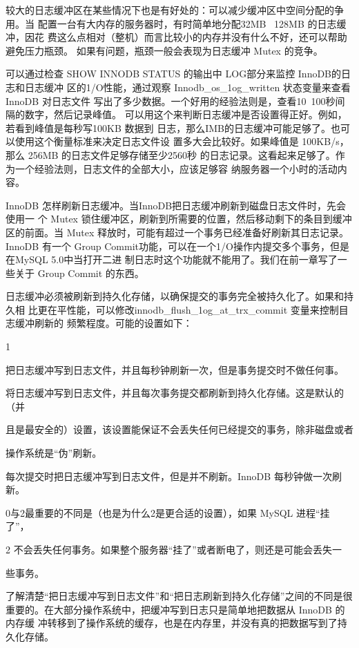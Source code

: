 较大的日志缓冲区在某些情况下也是有好处的：可以减少缓冲区中空间分配的争用。当
配置一台有大内存的服务器时，有时简单地分配32MB~ 128MB 的日志缓冲，因花
费这么点相对（整机）而言比较小的内存并没有什么不好，还可以帮助避免压力瓶颈。
如果有问题，瓶颈一般会表现为日志缓冲 Mutex 的竞争。

可以通过检查 SHOW INNODB STATUS 的输出中 LOG部分来监控 InnoDB的日志和日志缓冲
区的1/O性能，通过观察 Innodb\_os\_1og\_written 状态变量来查看InnoDB 对日志文件
写出了多少数据。一个好用的经验法则是，查看10~100秒间隔的数字，然后记录峰值。
可以用这个来判断日志缓冲是否设置得正好。例如，若看到峰值是每秒写100KB 数据到
日志，那么IMB的日志缓冲可能足够了。也可以使用这个衡量标准来决定日志文件设
置多大会比较好。如果峰值是 100KB/s，那么 256MB 的日志文件足够存储至少2560秒
的日志记录。这看起来足够了。作为一个经验法则，日志文件的全部大小，应该足够容
纳服务器一个小时的活动内容。

InnoDB 怎样刷新日志缓冲。当InnoDB把日志缓冲刷新到磁盘日志文件时，先会使用一
个 Mutex 锁住缓冲区，刷新到所需要的位置，然后移动剩下的条目到缓冲区的前面。当
Mutex 释放时，可能有超过一个事务已经准备好刷新其日志记录。InnoDB 有一个 Group
Commit功能，可以在一个1/O操作内提交多个事务，但是在MySQL 5.0中当打开二进
制日志时这个功能就不能用了。我们在前一章写了一些关于 Group Commit 的东西。

日志缓冲必须被刷新到持久化存储，以确保提交的事务完全被持久化了。如果和持久相
比更在平性能，可以修改innodb\_flush\_1og\_at\_trx\_commit 变量来控制目志缓冲刷新的
频繁程度。可能的设置如下：

1

把日志缓冲写到日志文件，并且每秒钟刷新一次，但是事务提交时不做任何事。

将日志缓冲写到日志文件，并且每次事务提交都刷新到持久化存储。这是默认的（并

且是最安全的）设置，该设置能保证不会丢失任何已经提交的事务，除非磁盘或者

操作系统是“伪”刷新。

每次提交时把日志缓冲写到日志文件，但是并不刷新。InnoDB 每秒钟做一次刷新。

0与2最重要的不同是（也是为什么2是更合适的设置），如果 MySQL 进程“挂了”，

2 不会丢失任何事务。如果整个服务器“挂了”或者断电了，则还是可能会丢失一

些事务。

了解清楚“把日志缓冲写到日志文件”和“把日志刷新到持久化存储”之间的不同是很
重要的。在大部分操作系统中，把缓冲写到日志只是简单地把数据从 InnoDB 的内存缓
冲转移到了操作系统的缓存，也是在内存里，并没有真的把数据写到了持久化存储。


